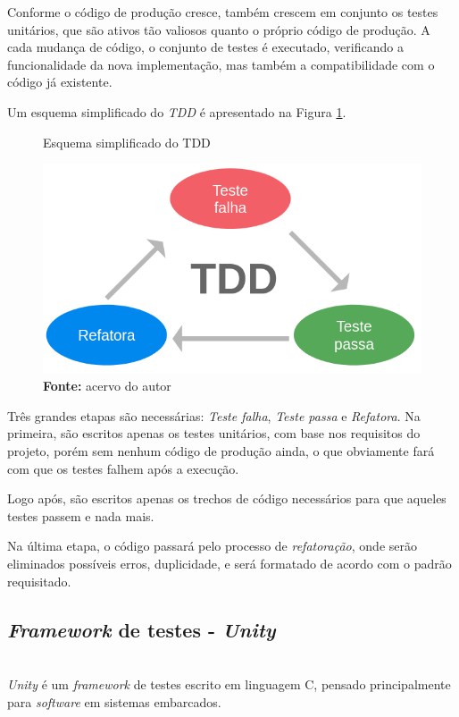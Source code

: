 \documentclass[times, twoside, watermark]{artigo}
\begin{document}
Conforme o código de produção cresce, também crescem em conjunto os testes unitários,
que são ativos tão valiosos quanto o próprio código de produção.
A cada mudança de código, o conjunto de testes é executado, verificando a
funcionalidade da nova implementação, mas também a compatibilidade com o código já
existente\cite{tddembeddedc}.

Um esquema simplificado do \textit{TDD} é apresentado na Figura \ref{fig:tdd}.\hfill\

\begin{figure}[H]
  \centering
  \caption{Esquema simplificado do TDD}
  \includegraphics[width=0.95\linewidth]{images/tdd.png}
  \caption*{\newline\textbf{Fonte:} acervo do autor}
  \label{fig:tdd}
\end{figure}

Três grandes etapas são necessárias: \textit{Teste falha}, \textit{Teste passa}
e \textit{Refatora}. Na primeira, são escritos apenas os testes unitários, com base
nos requisitos do projeto, porém sem nenhum código de produção ainda, o que
obviamente fará com que os testes falhem após a execução.

Logo após, são escritos apenas os trechos de código necessários para que aqueles
testes passem e nada mais.

Na última etapa, o código passará pelo processo de \textit{refatoração}, onde serão
eliminados possíveis erros, duplicidade, e será formatado de acordo com o padrão
requisitado.


\subsection{\textit{Framework} de testes - \textit{Unity}}\hfill\\

\textit{Unity} é um \textit{framework} de testes escrito em linguagem C, pensado
principalmente para \textit{software} em sistemas embarcados.
\end{document}
